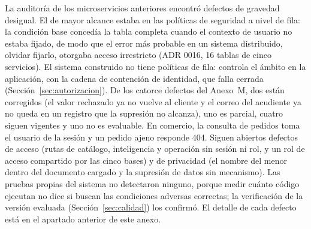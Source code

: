 La auditoría de los microservicios anteriores encontró defectos de gravedad desigual. El de mayor
alcance estaba en las políticas de seguridad a nivel de fila: la condición base concedía la tabla
completa cuando el contexto de usuario no estaba fijado, de modo que el error más probable en un
sistema distribuido, olvidar fijarlo, otorgaba acceso irrestricto (ADR 0016, 16 tablas de cinco
servicios). El sistema construido no tiene políticas de fila: controla el ámbito en la aplicación,
con la cadena de contención de identidad, que falla cerrada (Sección~\ref{sec:autorizacion}).
De los catorce defectos del Anexo~M, dos están corregidos (el valor rechazado ya no vuelve al
cliente y el correo del acudiente ya no queda en un registro que la supresión no alcanza), uno es
parcial, cuatro siguen vigentes y uno no es evaluable. En comercio, la consulta de pedidos toma el
usuario de la sesión y un pedido ajeno responde 404. Siguen abiertos defectos de acceso (rutas de
catálogo, inteligencia y operación sin sesión ni rol, y un rol de acceso compartido por las cinco
bases) y de privacidad (el nombre del menor dentro del documento cargado y la supresión de datos
sin mecanismo). Las pruebas propias del sistema no detectaron ninguno, porque medir cuánto código
ejecutan no dice si buscan las condiciones adversas correctas; la verificación de la versión
evaluada (Sección~\ref{sec:calidad}) los confirmó. El detalle de cada defecto está en el
apartado anterior de este anexo.

